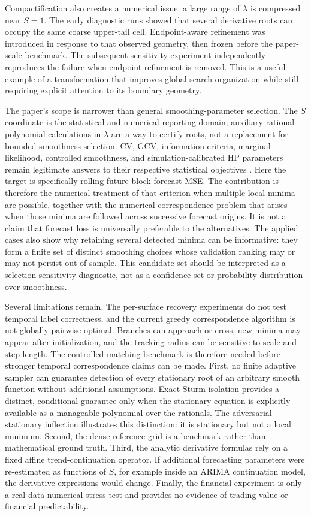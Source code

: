 \documentclass[english]{smcca}
\begin{document}
Compactification also creates a numerical issue: a large range of \(\lambda\) is compressed near \(S=1\). The early diagnostic runs showed that several derivative roots can occupy the same coarse upper-tail cell. Endpoint-aware refinement was introduced in response to that observed geometry, then frozen before the paper-scale benchmark. The subsequent sensitivity experiment independently reproduces the failure when endpoint refinement is removed. This is a useful example of a transformation that improves global search organization while still requiring explicit attention to its boundary geometry.

The paper's scope is narrower than general smoothing-parameter selection. The $S$ coordinate is the statistical and numerical reporting domain; auxiliary rational polynomial calculations in $\lambda$ are a way to certify roots, not a replacement for bounded smoothness selection. CV, GCV, information criteria, marginal likelihood, controlled smoothness, and simulation-calibrated HP parameters remain legitimate answers to their respective statistical objectives \cite{craven1979gcv,guerrero2008smoothness,cortes2017smoothness,biessy2026wh,franke2026hp}. Here the target is specifically rolling future-block forecast MSE. The contribution is therefore the numerical treatment of that criterion when multiple local minima are possible, together with the numerical correspondence problem that arises when those minima are followed across successive forecast origins. It is not a claim that forecast loss is universally preferable to the alternatives. The applied cases also show why retaining several detected minima can be informative: they form a finite set of distinct smoothing choices whose validation ranking may or may not persist out of sample. This candidate set should be interpreted as a selection-sensitivity diagnostic, not as a confidence set or probability distribution over smoothness.

Several limitations remain. The per-surface recovery experiments do not test
temporal label correctness, and the current greedy correspondence algorithm
is not globally pairwise optimal. Branches can approach or cross, new minima
may appear after initialization, and the tracking radius can be sensitive
to scale and step length. The controlled matching benchmark is therefore
needed before stronger temporal correspondence claims can be made.
First, no finite adaptive sampler can guarantee detection of every stationary root of an arbitrary smooth function without additional assumptions. Exact Sturm isolation provides a distinct, conditional guarantee only when the stationary equation is explicitly available as a manageable polynomial over the rationals. The adversarial stationary inflection illustrates this distinction: it is stationary but not a local minimum. Second, the dense reference grid is a benchmark rather than mathematical ground truth. Third, the analytic derivative formulas rely on a fixed affine trend-continuation operator. If additional forecasting parameters were re-estimated as functions of \(S\), for example inside an ARIMA continuation model, the derivative expressions would change. Finally, the financial experiment is only a real-data numerical stress test and provides no evidence of trading value or financial predictability.
\end{document}
